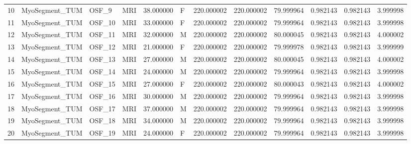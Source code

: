 \begin{tabular}{llllrlrrrrrr}
10     &  MyoSegment\_TUM &        OSF\_9 &                MRI &  38.000000 &        F &       220.000002 &    220.000002 &   79.999964 &               0.982143 &            0.982143 &          3.999998 \\
11     &  MyoSegment\_TUM &       OSF\_10 &                MRI &  33.000000 &        F &       220.000002 &    220.000002 &   79.999964 &               0.982143 &            0.982143 &          3.999998 \\
12     &  MyoSegment\_TUM &       OSF\_11 &                MRI &  32.000000 &        M &       220.000002 &    220.000002 &   80.000045 &               0.982143 &            0.982143 &          4.000002 \\
13     &  MyoSegment\_TUM &       OSF\_12 &                MRI &  21.000000 &        F &       220.000002 &    220.000002 &   79.999978 &               0.982143 &            0.982143 &          3.999999 \\
14     &  MyoSegment\_TUM &       OSF\_13 &                MRI &  27.000000 &        M &       220.000002 &    220.000002 &   80.000045 &               0.982143 &            0.982143 &          4.000002 \\
15     &  MyoSegment\_TUM &       OSF\_14 &                MRI &  24.000000 &        M &       220.000002 &    220.000002 &   79.999964 &               0.982143 &            0.982143 &          3.999998 \\
16     &  MyoSegment\_TUM &       OSF\_15 &                MRI &  27.000000 &        F &       220.000002 &    220.000002 &   80.000043 &               0.982143 &            0.982143 &          4.000002 \\
17     &  MyoSegment\_TUM &       OSF\_16 &                MRI &  30.000000 &        M &       220.000002 &    220.000002 &   79.999964 &               0.982143 &            0.982143 &          3.999998 \\
18     &  MyoSegment\_TUM &       OSF\_17 &                MRI &  37.000000 &        M &       220.000002 &    220.000002 &   79.999964 &               0.982143 &            0.982143 &          3.999998 \\
19     &  MyoSegment\_TUM &       OSF\_18 &                MRI &  34.000000 &        M &       220.000002 &    220.000002 &   79.999964 &               0.982143 &            0.982143 &          3.999998 \\
20     &  MyoSegment\_TUM &       OSF\_19 &                MRI &  24.000000 &        F &       220.000002 &    220.000002 &   79.999964 &               0.982143 &            0.982143 &          3.999998 \\

\end{tabular}
